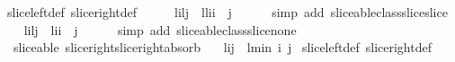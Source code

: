 \begin{isabellebody}
\isadelimproof
%
\endisadelimproof
%
\isatagproof
{}\isamarkupfalse%
\ slice{\isacharunderscore}left{\isacharunderscore}def\ slice{\isacharunderscore}right{\isacharunderscore}def\isanewline
{}\isamarkupfalse%
\ {\isacharminus}\isanewline
\ \ \isamarkupfalse%
\ {\isachardoublequoteopen}{\isacharparenleft}l{\isasymdagger}i{\isachardot}{\isachardot}{\isacharparenleft}{\isacharhash}l{\isacharparenright}{\isacharparenright}{\isasymdagger}{}{\isachardot}{\isachardot}j\ {\isacharequal}\ {\isacharparenleft}l{\isasymdagger}{}{\isachardot}{\isachardot}{\isacharparenleft}{\isacharhash}l{\isacharparenright}{\isacharparenright}{\isasymdagger}i{\isachardot}{\isachardot}{\isacharparenleft}i\ {\isacharplus}\ j{\isacharparenright}{\isachardoublequoteclose}\isanewline
\ \ \ \ \isamarkupfalse%
\ {\isacharparenleft}simp\ add{\isacharcolon}\ sliceable{\isacharunderscore}class{\isachardot}slice{\isacharunderscore}slice{\isacharparenright}\isanewline
\ \ \isamarkupfalse%
\ {\isachardoublequoteopen}{\isacharparenleft}l{\isasymdagger}i{\isachardot}{\isachardot}{\isacharparenleft}{\isacharhash}l{\isacharparenright}{\isacharparenright}{\isasymdagger}{}{\isachardot}{\isachardot}j\ {\isacharequal}\ l{\isasymdagger}i{\isachardot}{\isachardot}{\isacharparenleft}i\ {\isacharplus}\ j{\isacharparenright}{\isachardoublequoteclose}\isanewline
\ \ \ \ \isamarkupfalse%
\ {\isacharparenleft}simp\ add{\isacharcolon}\ sliceable{\isacharunderscore}class{\isachardot}slice{\isacharunderscore}none{\isacharparenright}\isanewline
{}\isamarkupfalse%
%
\endisatagproof
{\isafoldproof}%
%
\isadelimproof
\isanewline
%
\endisadelimproof
\isanewline
{}\isamarkupfalse%
\ {\isacharparenleft}\ sliceable{\isacharparenright}\ slice{\isacharunderscore}right{\isacharunderscore}slice{\isacharunderscore}right{\isacharunderscore}absorb{\isacharcolon}\ \isanewline
\ \ {\isachardoublequoteopen}{\isacharparenleft}l{\isasymdagger}{\isachardot}{\isachardot}i{\isacharparenright}{\isasymdagger}{\isachardot}{\isachardot}j\ {\isacharequal}\ {\isacharparenleft}l{\isasymdagger}{\isachardot}{\isachardot}{\isacharparenleft}min\ i\ j{\isacharparenright}{\isacharparenright}{\isachardoublequoteclose}\isanewline
%
\isadelimproof
%
\endisadelimproof
%
\isatagproof
{}\isamarkupfalse%
\ slice{\isacharunderscore}left{\isacharunderscore}def\ slice{\isacharunderscore}right{\isacharunderscore}def\isanewline
{}\isamarkupfalse%

\end{isabellebody}
